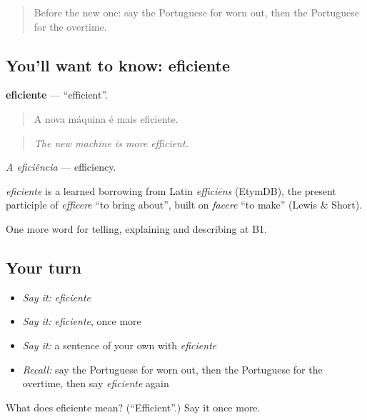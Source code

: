 \label{lesson:PT-C361-eficiente}



\begin{quote}
Before the new one: say the Portuguese for worn out, then the Portuguese for the overtime.
\end{quote}

\subsection*{You'll want to know: eficiente}
\textbf{eficiente} — \textquotedblleft{}efficient\textquotedblright{}.

\begin{quote}
A nova máquina é mais eficiente.
\end{quote}

\begin{quote}
\emph{The new machine is more efficient.}
\end{quote}

\emph{A eficiência} — efficiency.

\begin{cousinweb}
\emph{eficiente} is a learned borrowing from Latin \emph{efficiēns} (EtymDB), the present participle of \emph{efficere} \textquotedblleft{}to bring about\textquotedblright{}, built on \emph{facere} \textquotedblleft{}to make\textquotedblright{} (Lewis \& Short).
\end{cousinweb}

\begin{grammarlens}[title={What you've built}]
One more word for telling, explaining and describing at B1.
\end{grammarlens}

\subsection*{Your turn}
\begin{itemize}
\raggedright
  \item \emph{Say it:} \emph{eficiente}
  \item \emph{Say it:} \emph{eficiente}, once more
  \item \emph{Say it:} a sentence of your own with \emph{eficiente}
  \item \emph{Recall:} say the Portuguese for worn out, then the Portuguese for the overtime, then say \emph{eficiente} again
\end{itemize}

\begin{tcolorbox}[breakable,colback=teal!4,colframe=teal!35!black,title={Before you move on}]
What does eficiente mean? (\textquotedblleft{}Efficient\textquotedblright{}.) Say it once more.
\end{tcolorbox}

